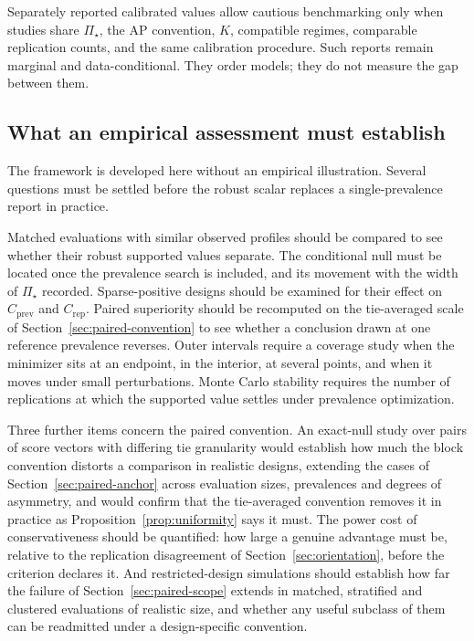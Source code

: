 \documentclass[11pt]{article}
\newcommand{\PSet}{\Pi_\star}
\theoremstyle{remark}
\begin{document}
Separately reported calibrated values allow cautious benchmarking only when studies share $\PSet$, the AP convention, $K$, compatible regimes, comparable replication counts, and the same calibration procedure. Such reports remain marginal and data-conditional. They order models; they do not measure the gap between them.

\subsection{What an empirical assessment must establish}

The framework is developed here without an empirical illustration. Several questions must be settled before the robust scalar replaces a single-prevalence report in practice.

Matched evaluations with similar observed profiles should be compared to see whether their robust supported values separate. The conditional null must be located once the prevalence search is included, and its movement with the width of $\PSet$ recorded. Sparse-positive designs should be examined for their effect on $C_{\mathrm{prev}}$ and $C_{\mathrm{rep}}$. Paired superiority should be recomputed on the tie-averaged scale of Section~\ref{sec:paired-convention} to see whether a conclusion drawn at one reference prevalence reverses. Outer intervals require a coverage study when the minimizer sits at an endpoint, in the interior, at several points, and when it moves under small perturbations. Monte Carlo stability requires the number of replications at which the supported value settles under prevalence optimization.

Three further items concern the paired convention. An exact-null study over pairs of score vectors with differing tie granularity would establish how much the block convention distorts a comparison in realistic designs, extending the cases of Section~\ref{sec:paired-anchor} across evaluation sizes, prevalences and degrees of asymmetry, and would confirm that the tie-averaged convention removes it in practice as Proposition~\ref{prop:uniformity} says it must. The power cost of conservativeness should be quantified: how large a genuine advantage must be, relative to the replication disagreement of Section~\ref{sec:orientation}, before the criterion declares it. And restricted-design simulations should establish how far the failure of Section~\ref{sec:paired-scope} extends in matched, stratified and clustered evaluations of realistic size, and whether any useful subclass of them can be readmitted under a design-specific convention.
\end{document}

